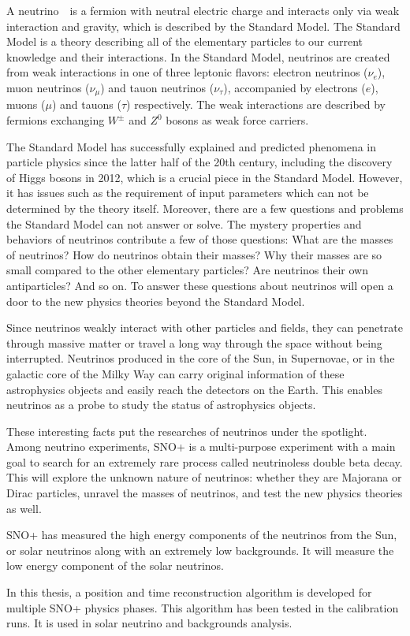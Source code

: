  
A neutrino　is a fermion with neutral electric charge and interacts only via weak interaction and gravity, which is described by the Standard Model. The Standard Model is a theory describing all of the elementary particles to our current knowledge and their interactions.
In the Standard Model, neutrinos are created from weak interactions in one of three leptonic flavors:
electron neutrinos ($\nu_e$), muon neutrinos ($\nu_\mu$) and tauon neutrinos ($\nu_\tau$), accompanied by electrons ($e$), muons ($\mu$) and tauons ($\tau$) respectively. The weak interactions are described by fermions exchanging $W^{\pm}$ and $Z^0$ bosons as weak force carriers.

The Standard Model has successfully explained and predicted phenomena in particle physics since the latter half of the 20th century, including the discovery of Higgs bosons in 2012, which is a crucial piece in the Standard Model. However, it has issues such as the requirement of input parameters which can not be determined by the theory itself. Moreover, there are a few questions and problems the Standard Model can not answer or solve. The mystery properties and behaviors of neutrinos contribute a few of those questions: What are the masses of neutrinos? How do neutrinos obtain their masses? Why their masses are so small compared to the other elementary particles? Are neutrinos their own antiparticles? And so on. To answer these questions about neutrinos will open a door to the new physics theories beyond the Standard Model.

Since neutrinos weakly interact with other particles and fields, they can penetrate through massive matter or travel a long way through the space without being interrupted. Neutrinos produced in the core of the Sun, in Supernovae, or in the galactic core of the Milky Way can carry original information of these astrophysics objects and easily reach the detectors on the Earth. This enables neutrinos as a probe to study the status of astrophysics objects.

These interesting facts put the researches of neutrinos under the spotlight. Among neutrino experiments, SNO+ is a multi-purpose experiment with a main goal to search for an extremely rare process called neutrinoless double beta decay. This will explore the unknown nature of neutrinos: whether they are Majorana or Dirac
particles, unravel the masses of neutrinos, and test the new physics theories as well.

SNO+ has measured the high energy components of the neutrinos from the Sun, or solar neutrinos along with an extremely low backgrounds. It will measure the low energy component of the solar neutrinos.

In this thesis, a position and time reconstruction algorithm is developed for multiple SNO+ physics phases. This algorithm has been tested in the calibration runs. It is used in solar neutrino and backgrounds analysis.